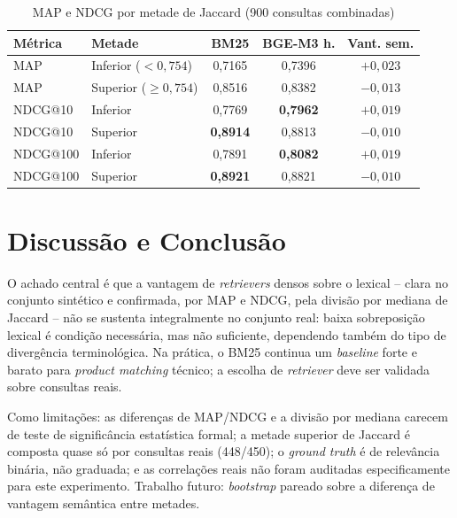 \documentclass[12pt]{article}
\begin{document}
\begin{table}[ht]
\centering
\small
\caption{MAP e NDCG por metade de Jaccard (900 consultas combinadas)}
\label{tab:split}
\begin{tabular}{|l|l|c|c|c|}
\hline
\textbf{M\'etrica} & \textbf{Metade} & \textbf{BM25} & \textbf{BGE-M3 h.} & \textbf{Vant. sem.} \\
\hline
MAP & Inferior ($<0{,}754$) & 0,7165 & 0,7396 & $+0{,}023$ \\
\hline
MAP & Superior ($\geq0{,}754$) & 0,8516 & 0,8382 & $-0{,}013$ \\
\hline
NDCG@10 & Inferior & 0,7769 & \textbf{0,7962} & $+0{,}019$ \\
\hline
NDCG@10 & Superior & \textbf{0,8914} & 0,8813 & $-0{,}010$ \\
\hline
NDCG@100 & Inferior & 0,7891 & \textbf{0,8082} & $+0{,}019$ \\
\hline
NDCG@100 & Superior & \textbf{0,8921} & 0,8821 & $-0{,}010$ \\
\hline
\end{tabular}
\end{table}

\section{Discuss\~ao e Conclus\~ao}

O achado central \'e que a vantagem de \emph{retrievers} densos sobre o lexical -- clara no conjunto sint\'etico e confirmada, por MAP e NDCG, pela divis\~ao por mediana de Jaccard -- n\~ao se sustenta integralmente no conjunto real: baixa sobreposi\c{c}\~ao lexical \'e condi\c{c}\~ao necess\'aria, mas n\~ao suficiente, dependendo tamb\'em do tipo de diverg\^encia terminol\'ogica. Na pr\'atica, o BM25 continua um \emph{baseline} forte e barato para \emph{product matching} t\'ecnico; a escolha de \emph{retriever} deve ser validada sobre consultas reais.

Como limita\c{c}\~oes: as diferen\c{c}as de MAP/NDCG e a divis\~ao por mediana carecem de teste de signific\^ancia estat\'istica formal; a metade superior de Jaccard \'e composta quase s\'o por consultas reais (448/450); o \emph{ground truth} \'e de relev\^ancia bin\'aria, n\~ao graduada; e as correla\c{c}\~oes reais n\~ao foram auditadas especificamente para este experimento. Trabalho futuro: \emph{bootstrap} pareado sobre a diferen\c{c}a de vantagem sem\^antica entre metades.



\end{document}
